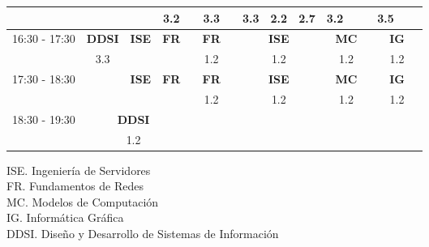 \documentclass[10pt,spanish, landscape]{article}
\begin{document}
\begin{minipage}{0.7\textwidth}
\begin{tabular}{|c|ccc|ccc|ccc|ccc|ccc|}
 & {\footnotesize  } & {\footnotesize  } & {\footnotesize 3.2} & {\footnotesize  } & {\footnotesize 3.3} & {\footnotesize  } & {\footnotesize 3.3} & {\footnotesize 2.2} & {\footnotesize 2.7} & {\footnotesize 3.2} & {\footnotesize  } & {\footnotesize } & {\footnotesize 3.5} & {\footnotesize } & {\footnotesize  }\\ 
 \hline
\multirow{2}{*}{16:30 - 17:30}  & \textbf{DDSI} & \textbf{ISE} & \textbf{FR}& \multicolumn{3}{|c|}{ \cellcolor{grisclaro} \textbf{FR}}& \multicolumn{3}{|c|}{ \cellcolor{grisclaro} \textbf{ISE}}& \multicolumn{3}{|c|}{ \cellcolor{grisclaro} \textbf{MC}}& \multicolumn{3}{|c|}{ \cellcolor{grisclaro} \textbf{IG}}\\ 
 & {\footnotesize 3.3} & {\footnotesize  } & {\footnotesize  }& \multicolumn{3}{|c|}{ \cellcolor{grisclaro} {\footnotesize 1.2}}& \multicolumn{3}{|c|}{ \cellcolor{grisclaro} {\footnotesize 1.2}}& \multicolumn{3}{|c|}{ \cellcolor{grisclaro} {\footnotesize 1.2}}& \multicolumn{3}{|c|}{ \cellcolor{grisclaro} {\footnotesize 1.2}}\\ 
 \hline
\multirow{2}{*}{17:30 - 18:30}  & \textbf{} & \textbf{ISE} & \textbf{FR}& \multicolumn{3}{|c|}{ \cellcolor{grisclaro} \textbf{FR}}& \multicolumn{3}{|c|}{ \cellcolor{grisclaro} \textbf{ISE}}& \multicolumn{3}{|c|}{ \cellcolor{grisclaro} \textbf{MC}}& \multicolumn{3}{|c|}{ \cellcolor{grisclaro} \textbf{IG}}\\ 
 & {\footnotesize } & {\footnotesize  } & {\footnotesize  }& \multicolumn{3}{|c|}{ \cellcolor{grisclaro} {\footnotesize 1.2}}& \multicolumn{3}{|c|}{ \cellcolor{grisclaro} {\footnotesize 1.2}}& \multicolumn{3}{|c|}{ \cellcolor{grisclaro} {\footnotesize 1.2}}& \multicolumn{3}{|c|}{ \cellcolor{grisclaro} {\footnotesize 1.2}}\\ 
 \hline
\multirow{2}{*}{18:30 - 19:30} & \multicolumn{3}{|c|}{ \cellcolor{grisclaro} \textbf{DDSI}} &  &  &  &  &  &  &  &  &  &  &  & \\ 
& \multicolumn{3}{|c|}{ \cellcolor{grisclaro} {\footnotesize 1.2}} &  &  &  &  &  &  &  &  &  &  &  & \\ 
 \hline

\end{tabular}
\end{minipage}
\begin{minipage}{0.25\textwidth}
ISE. Ingeniería de Servidores\\[0.5cm]
FR. Fundamentos de Redes\\[0.5cm]
MC. Modelos de Computación\\[0.5cm]
IG. Informática Gráfica\\[0.5cm]
DDSI. Diseño y Desarrollo de Sistemas de Información\\[0.5cm]
\end{minipage}
\newpage
\end{document}
